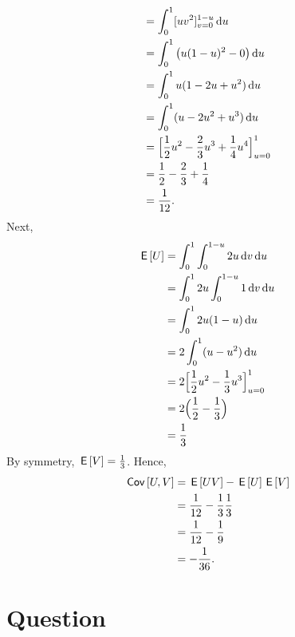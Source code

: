 \begin{exercise}
\begin{solution}
\begin{enumerate}
\begin{align}
        &= \int_0^1 [uv^2]_{v=0}^{1-u} \,\textrm{d}u \\
        &= \int_0^1 \big( u(1-u)^2 - 0\big) \,\textrm{d}u \\
        &= \int_0^1 u(1 - 2u + u^2) \,\textrm{d}u \\
        &= \int_0^1 (u - 2u^2 + u^3) \,\textrm{d}u \\
        &= \Big[ \frac{1}{2}u^2 - \frac{2}{3}u^3 + \frac{1}{4}u^4 \Big]_{u=0}^1 \\
        &= \frac{1}{2} - \frac{2}{3} + \frac{1}{4} \\
        &= \frac{1}{12}.
    \end{align}
    Next,
    \begin{align}
        \,\mathsf{E}\left[U\right] &= \int_0^1 \int_0^{1-u} 2 u \,\textrm{d}v \,\textrm{d}u \\
        &= \int_0^1 2 u \int_0^{1-u} 1 \,\textrm{d}v \,\textrm{d}u \\
        &= \int_0^1 2 u(1-u) \,\textrm{d}u \\
        &= 2 \int_0^1 (u - u^2) \,\textrm{d}u \\
        &= 2  \Big[\frac{1}{2}u^2 - \frac{1}{3}u^3\Big]_{u=0}^1 \\
        &= 2 \Big(\frac{1}{2} - \frac{1}{3}\Big) \\
        &= \frac{1}{3}
    \end{align}
    By symmetry, $\,\mathsf{E}\left[V\right] = \frac{1}{3}$. Hence,
    \begin{align}
        \,\mathsf{Cov}\left[U,V\right] &= \,\mathsf{E}\left[UV\right] - \,\mathsf{E}\left[U\right]\,\mathsf{E}\left[V\right] \\
        &= \frac{1}{12} - \frac{1}{3}\frac{1}{3}\\
        &= \frac{1}{12} - \frac{1}{9} \\
        &= -\frac{1}{36}.
    \end{align}
\end{enumerate}
\end{solution}
\end{exercise}

\section*{Question}




